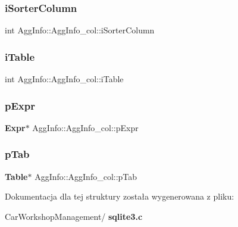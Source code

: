\subsubsection{iSorterColumn}
{\footnotesize\ttfamily int Agg\+Info\+::\+Agg\+Info\+\_\+col\+::i\+Sorter\+Column}

\mbox{\label{struct_agg_info_1_1_agg_info__col_ab49aa2fbfc6278c86b64497a6807c113}} 
\subsubsection{iTable}
{\footnotesize\ttfamily int Agg\+Info\+::\+Agg\+Info\+\_\+col\+::i\+Table}

\mbox{\label{struct_agg_info_1_1_agg_info__col_a60f23ec0abfcc88cab7083967a3abd9e}} 
\subsubsection{pExpr}
{\footnotesize\ttfamily \textbf{ Expr}$\ast$ Agg\+Info\+::\+Agg\+Info\+\_\+col\+::p\+Expr}

\mbox{\label{struct_agg_info_1_1_agg_info__col_ad2f2ae137b49e72d28a57accc9d06386}} 
\subsubsection{pTab}
{\footnotesize\ttfamily \textbf{ Table}$\ast$ Agg\+Info\+::\+Agg\+Info\+\_\+col\+::p\+Tab}



Dokumentacja dla tej struktury została wygenerowana z pliku\+:\begin{DoxyCompactItemize}
\item 
Car\+Workshop\+Management/\textbf{ sqlite3.\+c}\end{DoxyCompactItemize}
